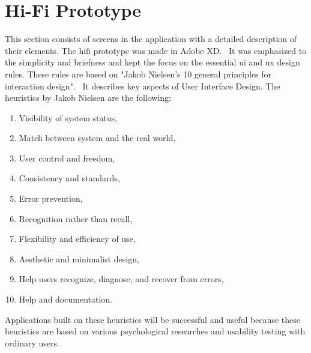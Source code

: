 \section{Hi-Fi Prototype}\label{sec:hi-fi-prototype}
This section consists of screens in the application with a detailed description of their elements.
The \acrshort{hifi} prototype was made in Adobe XD.~\cite{adobeXD}
It was emphasized to the simplicity and briefness and kept the focus on the essential \acrshort{ui} and \acrshort{ux} design rules.
These rules are based on "Jakob Nielsen's 10 general principles for interaction design".~\cite{nnGroup}
It describes key aspects of User Interface Design.
The heuristics by Jakob Nielsen are the following:
\begin{enumerate}
    \item Visibility of system status,
    \item Match between system and the real world,
    \item User control and freedom,
    \item Consistency and standards,
    \item Error prevention,
    \item Recognition rather than recall,
    \item Flexibility and efficiency of use,
    \item Aesthetic and minimalist design,
    \item Help users recognize, diagnose, and recover from errors,
    \item Help and documentation.
\end{enumerate}

Applications built on these heuristics will be successful and useful because these heuristics are based on various psychological researches and usability testing with ordinary users.














